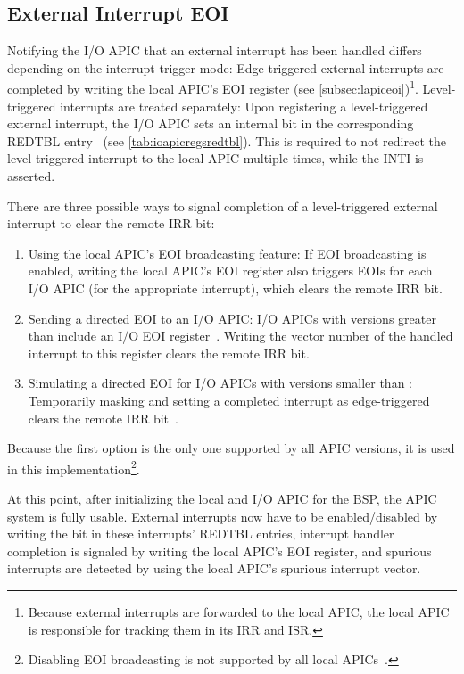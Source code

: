 \subsection{External Interrupt EOI}
\label{subsec:ioapiceoi}

Notifying the I/O APIC that an external interrupt has been handled differs depending on the interrupt trigger mode: Edge-triggered external interrupts are completed by writing the local APIC's EOI register (see \autoref{subsec:lapiceoi})\footnote{
  Because external interrupts are forwarded to the local APIC, the local APIC is responsible for tracking them in its IRR and ISR.}.
Level-triggered interrupts are treated separately: Upon registering a level-triggered external interrupt, the I/O APIC sets an internal  bit in the corresponding REDTBL entry~\autocite[sec.~9.5.8]{ich5} (see \autoref{tab:ioapicregsredtbl}).
This is required to not redirect the level-triggered interrupt to the local APIC multiple times, while the INTI is asserted.

There are three possible ways to signal completion of a level-triggered external interrupt to clear the remote IRR bit:

\begin{enumerate}
  \item Using the local APIC's EOI broadcasting feature: If EOI broadcasting is enabled, writing the local APIC's EOI register also triggers EOIs for each I/O APIC (for the appropriate interrupt), which clears the remote IRR bit.
  \item Sending a directed EOI to an I/O APIC\@: I/O APICs with versions greater than  include an I/O EOI register~\autocite[sec.~9.5.5]{ich5}.
        Writing the vector number of the handled interrupt to this register clears the remote IRR bit.
  \item Simulating a directed EOI for I/O APICs with versions smaller than : Temporarily masking and setting a completed interrupt as edge-triggered clears the remote IRR bit~\autocite[io\textunderscore{}apic.c]{linux}.
\end{enumerate}

Because the first option is the only one supported by all APIC versions, it is used in this implementation\footnote{
  Disabling EOI broadcasting is not supported by all local APICs~\autocite[sec.~3.11.8.5]{ia32}.}.

At this point, after initializing the local and I/O APIC for the BSP, the APIC system is fully usable.
External interrupts now have to be enabled/disabled by writing the  bit in these interrupts' REDTBL entries, interrupt handler completion is signaled by writing the local APIC's EOI register, and spurious interrupts are detected by using the local APIC's spurious interrupt vector.

